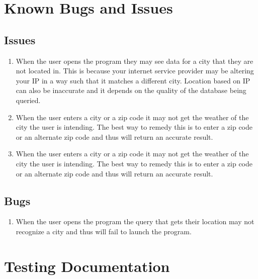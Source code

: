 \documentclass[12pt, titlepage]{article}
\begin{document}
\section{Known Bugs and Issues}
\subsection{Issues}
\begin{enumerate}
    \item When the user opens the program they may see data for a city that they are not located in.  This is because your internet service provider may be altering your IP in a way such that it matches a different city.  Location based on IP can also be inaccurate and it depends on the quality of the database being queried.
    \item When the user enters a city or a zip code it may not get the weather of the city the user is intending.  The best way to remedy this is to enter a zip code or an alternate zip code and thus will return an accurate result.
    \item When the user enters a city or a zip code it may not get the weather of the city the user is intending.  The best way to remedy this is to enter a zip code or an alternate zip code and thus will return an accurate result.
\end{enumerate}

\subsection{Bugs}

\begin{enumerate}
    \item When the user opens the program the query that gets their location may not recognize a city and thus will fail to launch the program.  
\end{enumerate}

\pagebreak
\section{Testing Documentation}




\end{document}
